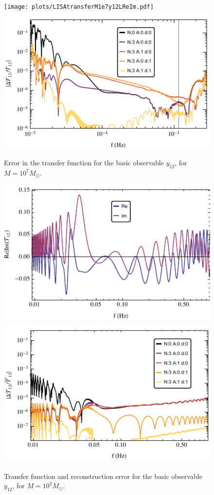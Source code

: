 \documentclass[aps,showpacs,twocolumn,
prd,superscriptaddress,nofootinbib]{revtex4-1}
\newcommand{\Msol}{M_{\odot}}
\begin{document}
\begin{figure}
  \centering
  \texttt{[image: plots/LISAtransferM1e7y12LReIm.pdf]}
  \includegraphics[width=.98\linewidth]{plots/LISAerrorM1e7y12L.pdf}
  \caption{Error in the transfer function for the basic observable $y_{12}$, for $M=10^{7} \Msol$.}
  \label{fig:LISAerrorM1e7const}
\end{figure}

\begin{figure}
  \centering
  \includegraphics[width=.98\linewidth]{plots/LISAtransferM1e2y12LReIm.pdf}
  \includegraphics[width=.98\linewidth]{plots/LISAerrorM1e2y12L.pdf}
  \caption{Transfer function and reconstruction error for the basic observable $y_{12}$, for $M=10^{2} \Msol$.}
  \label{fig:LISAerrorM1e2const}
\end{figure}
\end{document}
